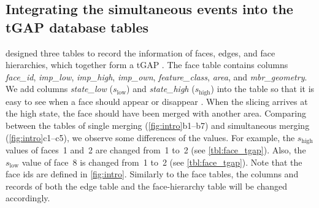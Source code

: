 \documentclass[twocolumn]{svjour3}          %
\begin{document}
\subsection{Integrating the simultaneous events into the tGAP database tables}
\label{sec:integrate_tgap}

\citet[]{Meijers2011Thesis} designed three tables 
to record the information of
faces, edges, and face hierarchies, 
which together form a tGAP
.
The face table contains columns \emph{face\_id}, 
\emph{imp\_low}, \emph{imp\_high}, \emph{imp\_own},
\emph{feature\_class}, \emph{area}, and \emph{mbr\_geometry}.
We add columns \emph{state\_low} ($s_\mathrm{low}$) 
and \emph{state\_high} ($s_\mathrm{high}$) into the table 
so that it is easy to see when a face should appear or disappear 
.
When the slicing arrives at the high state,
the face should have been merged with another area.
Comparing between the tables of single merging 
(\figs\ref{fig:intro}b1--b7)
and simultaneous merging (\figs\ref{fig:intro}c1--c5),
we observe some differences of the values.
For example, the $s_\mathrm{high}$ values of faces~1 and~2 
are changed from~1 to~2 (see \tabl\ref{tbl:face_tgap}).
Also, the $s_\mathrm{low}$ value of face~8 is changed from~1 to~2
(see \tabl\ref{tbl:face_tgap}).
Note that the face ids are defined in \fig\ref{fig:intro}.
Similarly to the face tables, 
the columns and records of both the edge table and the face-hierarchy table 
will be changed accordingly.
\end{document}
